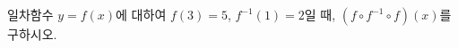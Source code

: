 \hspace*{2mm}\begin{minipage}[t]{\dimexpr\linewidth-2mm\relax}\vspace{0pt}
일차함수 $y=f(x)$에 대하여 $f(3)=5$, $f^{-1}(1)=2$일 때, $(f\circ f^{-1}\circ f)(x)$를 구하시오.\end{minipage}
